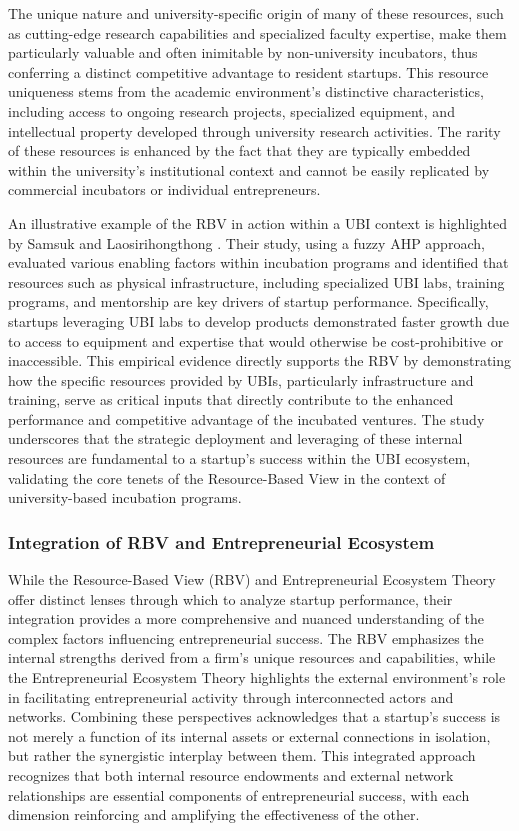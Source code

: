 \documentclass[../Main.tex]{subfiles}
\begin{document}
The unique nature and university-specific origin of many of these resources, such as cutting-edge research capabilities and specialized faculty expertise, make them particularly valuable and often inimitable by non-university incubators, thus conferring a distinct competitive advantage to resident startups. This resource uniqueness stems from the academic environment's distinctive characteristics, including access to ongoing research projects, specialized equipment, and intellectual property developed through university research activities. The rarity of these resources is enhanced by the fact that they are typically embedded within the university's institutional context and cannot be easily replicated by commercial incubators or individual entrepreneurs.

An illustrative example of the RBV in action within a UBI context is highlighted by Samsuk and Laosirihongthong \autocite{samsuk2014fuzzy}. Their study, using a fuzzy AHP approach, evaluated various enabling factors within incubation programs and identified that resources such as physical infrastructure, including specialized UBI labs, training programs, and mentorship are key drivers of startup performance. Specifically, startups leveraging UBI labs to develop products demonstrated faster growth due to access to equipment and expertise that would otherwise be cost-prohibitive or inaccessible. This empirical evidence directly supports the RBV by demonstrating how the specific resources provided by UBIs, particularly infrastructure and training, serve as critical inputs that directly contribute to the enhanced performance and competitive advantage of the incubated ventures. The study underscores that the strategic deployment and leveraging of these internal resources are fundamental to a startup's success within the UBI ecosystem, validating the core tenets of the Resource-Based View in the context of university-based incubation programs.

\subsubsection{Integration of RBV and Entrepreneurial Ecosystem}

While the Resource-Based View (RBV) and Entrepreneurial Ecosystem Theory offer distinct lenses through which to analyze startup performance, their integration provides a more comprehensive and nuanced understanding of the complex factors influencing entrepreneurial success. The RBV emphasizes the internal strengths derived from a firm's unique resources and capabilities, while the Entrepreneurial Ecosystem Theory highlights the external environment's role in facilitating entrepreneurial activity through interconnected actors and networks. Combining these perspectives acknowledges that a startup's success is not merely a function of its internal assets or external connections in isolation, but rather the synergistic interplay between them. This integrated approach recognizes that both internal resource endowments and external network relationships are essential components of entrepreneurial success, with each dimension reinforcing and amplifying the effectiveness of the other.
\end{document}
